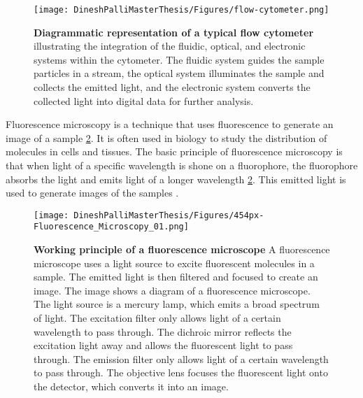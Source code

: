 \documentclass[12pt,a4paper]{article}
\begin{document}
\begin{figure}
  \centering
  \texttt{[image: DineshPalliMasterThesis/Figures/flow-cytometer.png]}
  \caption[Diagrammatic representation of a typical flow cytometer]{\textbf{Diagrammatic representation of a typical flow cytometer} illustrating the integration of the fluidic, optical, and electronic systems within the cytometer. The fluidic system guides the sample particles in a stream, the optical system illuminates the sample and collects the emitted light, and the electronic system converts the collected light into digital data for further analysis. \cite{aatbioFundamentalsFlow}}
  \label{flowcytometry}
\end{figure}

Fluorescence microscopy is a technique that uses fluorescence to generate an image of a sample \ref{fluorescencemicroscopy}. It is often used in biology to study the distribution of molecules in cells and tissues. The basic principle of fluorescence microscopy is that when light of a specific wavelength is shone on a fluorophore, the fluorophore absorbs the light and emits light of a longer wavelength \ref{fluorescencemicroscopy}. This emitted light is used to generate images of the samples \cite{sanderson_smith_parker_bootman_2014}.

\begin{figure}
  \centering
  \texttt{[image: DineshPalliMasterThesis/Figures/454px-Fluorescence\_Microscopy\_01.png]}
  \caption[Working principle of fluorescence microscopy]{\textbf{Working principle of a fluorescence microscope }A fluorescence microscope uses a light source to excite fluorescent molecules in a sample. The emitted light is then filtered and focused to create an image. The image shows a diagram of a fluorescence microscope. The light source is a mercury lamp, which emits a broad spectrum of light. The excitation filter only allows light of a certain wavelength to pass through. The dichroic mirror reflects the excitation light away and allows the fluorescent light to pass through. The emission filter only allows light of a certain wavelength to pass through. The objective lens focuses the fluorescent light onto the detector, which converts it into an image.}
  \label{fluorescencemicroscopy}
\end{figure}
\end{document}
